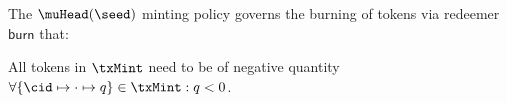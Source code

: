 \noindent The $\muHead(\seed)$ minting policy governs the burning of tokens via
redeemer $\mathsf{burn}$ that:
\begin{menumerate}
	\item All tokens in $\txMint$ need to be of negative quantity
	$\forall \{\cid \mapsto \cdot \mapsto q\} \in \txMint : q < 0$.
\end{menumerate}

\FloatBarrier{}

